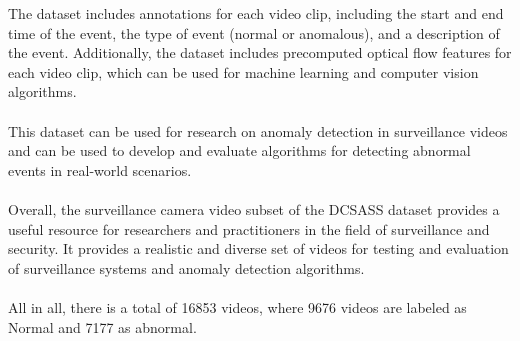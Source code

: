 \documentclass[title page]{article}
\begin{document}
The dataset includes annotations for each video clip, including the start and end time of the event, the type of event (normal or anomalous), and a description of the event. Additionally, the dataset includes precomputed optical flow features for each video clip, which can be used for machine learning and computer vision algorithms.
\\ \\
This dataset can be used for research on anomaly detection in surveillance videos and can be used to develop and evaluate algorithms for detecting abnormal events in real-world scenarios.
\\ \\
Overall, the surveillance camera video subset of the DCSASS dataset provides a useful resource for researchers and practitioners in the field of surveillance and security. It provides a realistic and diverse set of videos for testing and evaluation of surveillance systems and anomaly detection algorithms.
\\ \\
All in all, there is a total of 16853 videos, where 9676 videos are labeled as Normal and 7177 as abnormal.
\end{document}
